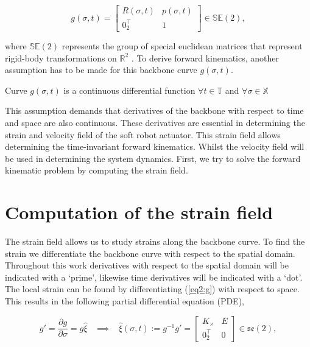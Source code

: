 \begin{equation}
    g(\sigma,t) = \begin{bmatrix}  R(\sigma,t) & p(\sigma,t) \\ 0_2^\top & 1 \end{bmatrix} \in \mathbb{SE}(2),
    \label{eq2:g}
\end{equation}

where $\mathbb{SE}(2)$ represents the group of special euclidean matrices that represent rigid-body transformations on $\mathbb{R}^2$ \cite{Sola2018}. To derive forward kinematics, another assumption has to be made for this backbone curve $g(\sigma,t)$.

\begin{theorem}
Curve  $g(\sigma,t)$ is a continuous differential function $ \forall t \in 
\mathbb{T} $ and $\forall \sigma \in \mathbb{X}$
\end{theorem}

This assumption demands that derivatives of the backbone with respect to time and space are also continuous. These derivatives are essential in determining the strain and velocity field of the soft robot actuator. This strain field allows determining the time-invariant forward kinematics. Whilst the velocity field will be used in determining the system dynamics. First, we try to solve the forward kinematic problem by computing the strain field.



\section{Computation of the strain field}

The strain field allows us to study strains along the backbone curve. To find the strain we differentiate the backbone curve with respect to the spatial domain. Throughout this work derivatives with respect to the spatial domain will be indicated with a `prime', likewise time derivatives will be indicated with a `dot'. The local strain can be found by differentiating (\ref{eq2:g}) with respect to space. This results in the following partial differential equation (PDE), 

\begin{equation}
   g' = \frac{\partial g}{\partial \sigma} = g \hat{\xi} \hspace{10pt} \implies \hspace{10pt}  \hat{\xi}(\sigma,t) := g^{-1}g' = \begin{bmatrix} K_\times & E \\ 0_2^\top & 0 \end{bmatrix} \in  \mathfrak{se}(2),
    \label{eq2:dgdsigma}
\end{equation}

